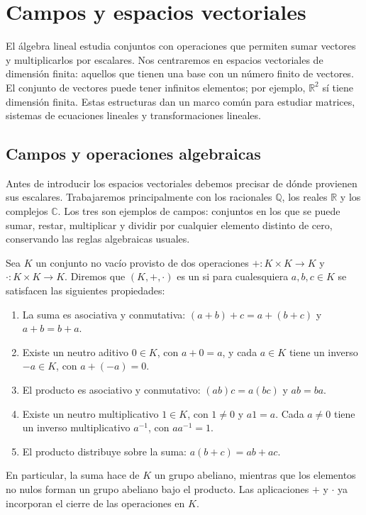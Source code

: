 \chapter{Campos y espacios vectoriales}
\label{cap:campos-espacios}

El álgebra lineal estudia conjuntos con operaciones que permiten sumar vectores y multiplicarlos por escalares. Nos centraremos en espacios vectoriales de dimensión finita: aquellos que tienen una base con un número finito de vectores. El conjunto de vectores puede tener infinitos elementos; por ejemplo, $\mathbb{R}^2$ sí tiene dimensión finita. Estas estructuras dan un marco común para estudiar matrices, sistemas de ecuaciones lineales y transformaciones lineales.
\section{Campos y operaciones algebraicas}
Antes de introducir los espacios vectoriales debemos precisar de dónde provienen sus escalares. Trabajaremos principalmente con los racionales $\mathbb{Q}$, los reales $\mathbb{R}$ y los complejos $\mathbb{C}$. Los tres son ejemplos de campos: conjuntos en los que se puede sumar, restar, multiplicar y dividir por cualquier elemento distinto de cero, conservando las reglas algebraicas usuales.
\begin{definition}
Sea $K$ un conjunto no vacío provisto de dos operaciones
\(+\colon K\times K\to K\) y \(\cdot\colon K\times K\to K\).
Diremos que $(K,+,\cdot)$ es un  si para cualesquiera $a,b,c\in K$ se satisfacen las siguientes propiedades:
\begin{enumerate}
\item La suma es asociativa y conmutativa: $(a+b)+c=a+(b+c)$ y $a+b=b+a$.
\item Existe un neutro aditivo $0\in K$, con $a+0=a$, y cada $a\in K$ tiene un inverso $-a\in K$, con $a+(-a)=0$.
\item El producto es asociativo y conmutativo: $(ab)c=a(bc)$ y $ab=ba$.
\item Existe un neutro multiplicativo $1\in K$, con $1\neq0$ y $a1=a$. Cada $a\neq0$ tiene un inverso multiplicativo $a^{-1}$, con $aa^{-1}=1$.
\item El producto distribuye sobre la suma: $a(b+c)=ab+ac$.
\end{enumerate}
\end{definition}
\noindent En particular, la suma hace de $K$ un grupo abeliano, mientras que los elementos no nulos forman un grupo abeliano bajo el producto. Las aplicaciones $+$ y $\cdot$ ya incorporan el cierre de las operaciones en $K$.
